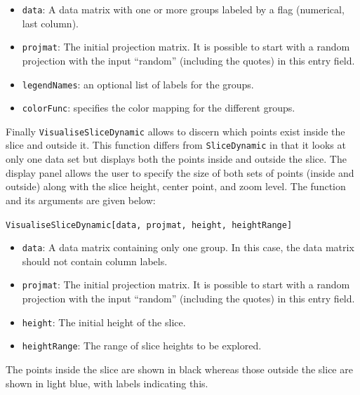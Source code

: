 \documentclass[]{interact}
\theoremstyle{plain}%
\theoremstyle{definition}
\theoremstyle{remark}
\providecommand{\tightlist}{%
  \setlength{\itemsep}{0pt}\setlength{\parskip}{0pt}}
\def\tightlist{}
\begin{document}
\begin{itemize}
\tightlist
\item
  \texttt{data}: A data matrix with one or more groups labeled by a flag
  (numerical, last column).
\item
  \texttt{projmat}: The initial projection matrix. It is possible to
  start with a random projection with the input ``random'' (including
  the quotes) in this entry field.
\item
  \texttt{legendNames}: an optional list of labels for the groups.
\item
  \texttt{colorFunc}: specifies the color mapping for the different
  groups.
\end{itemize}

Finally \texttt{VisualiseSliceDynamic} allows to discern which points
exist inside the slice and outside it. This function differs from
\texttt{SliceDynamic} in that it looks at only one data set but displays
both the points inside and outside the slice. The display panel allows
the user to specify the size of both sets of points (inside and outside)
along with the slice height, center point, and zoom level. The function
and its arguments are given below:

\texttt{VisualiseSliceDynamic{[}data,\ projmat,\ height,\ heightRange{]}}

\begin{itemize}
\tightlist
\item
  \texttt{data}: A data matrix containing only one group. In this case,
  the data matrix should not contain column labels.
\item
  \texttt{projmat}: The initial projection matrix. It is possible to
  start with a random projection with the input ``random'' (including
  the quotes) in this entry field.
\item
  \texttt{height}: The initial height of the slice.
\item
  \texttt{heightRange}: The range of slice heights to be explored.
\end{itemize}

The points inside the slice are shown in black whereas those outside the
slice are shown in light blue, with labels indicating this.



\end{document}
